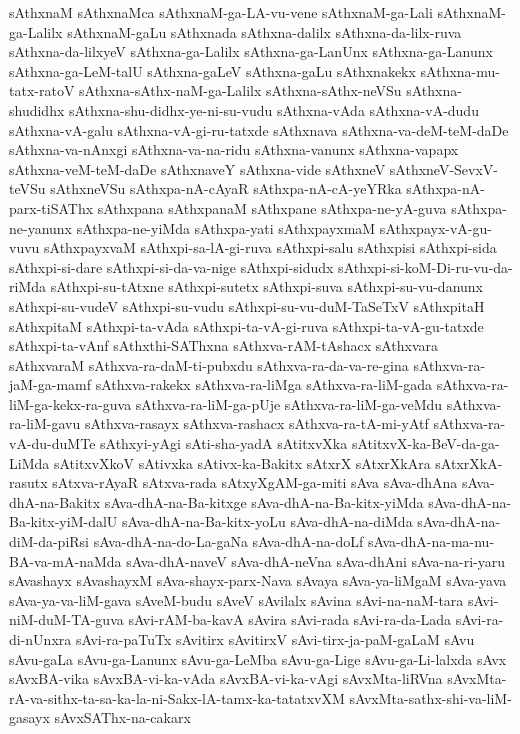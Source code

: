 {sAthxnaM
sAthxnaMca
sAthxnaM-ga-LA-vu-vene
sAthxnaM-ga-Lali
sAthxnaM-ga-Lalilx
sAthxnaM-gaLu
sAthxnada
sAthxna-dalilx
sAthxna-da-lilx-ruva
sAthxna-da-lilxyeV
sAthxna-ga-Lalilx
sAthxna-ga-LanUnx
sAthxna-ga-Lanunx
sAthxna-ga-LeM-talU
sAthxna-gaLeV
sAthxna-gaLu
sAthxnakekx
sAthxna-mu-tatx-ratoV
sAthxna-sAthx-naM-ga-Lalilx
sAthxna-sAthx-neVSu
sAthxna-shudidhx
sAthxna-shu-didhx-ye-ni-su-vudu
sAthxna-vAda
sAthxna-vA-dudu
sAthxna-vA-galu
sAthxna-vA-gi-ru-tatxde
sAthxnava
sAthxna-va-deM-teM-daDe
sAthxna-va-nAnxgi
sAthxna-va-na-ridu
sAthxna-vanunx
sAthxna-vapapx
sAthxna-veM-teM-daDe
sAthxnaveY
sAthxna-vide
sAthxneV
sAthxneV-SevxV-teVSu
sAthxneVSu
sAthxpa-nA-cAyaR
sAthxpa-nA-cA-yeYRka
sAthxpa-nA-parx-tiSAThx
sAthxpana
sAthxpanaM
sAthxpane
sAthxpa-ne-yA-guva
sAthxpa-ne-yanunx
sAthxpa-ne-yiMda
sAthxpa-yati
sAthxpayxmaM
sAthxpayx-vA-gu-vuvu
sAthxpayxvaM
sAthxpi-sa-lA-gi-ruva
sAthxpi-salu
sAthxpisi
sAthxpi-sida
sAthxpi-si-dare
sAthxpi-si-da-va-nige
sAthxpi-sidudx
sAthxpi-si-koM-Di-ru-vu-da-riMda
sAthxpi-su-tAtxne
sAthxpi-sutetx
sAthxpi-suva
sAthxpi-su-vu-danunx
sAthxpi-su-vudeV
sAthxpi-su-vudu
sAthxpi-su-vu-duM-TaSeTxV
sAthxpitaH
sAthxpitaM
sAthxpi-ta-vAda
sAthxpi-ta-vA-gi-ruva
sAthxpi-ta-vA-gu-tatxde
sAthxpi-ta-vAnf
sAthxthi-SAThxna
sAthxva-rAM-tAshacx
sAthxvara
sAthxvaraM
sAthxva-ra-daM-ti-pubxdu
sAthxva-ra-da-va-re-gina
sAthxva-ra-jaM-ga-mamf
sAthxva-rakekx
sAthxva-ra-liMga
sAthxva-ra-liM-gada
sAthxva-ra-liM-ga-kekx-ra-guva
sAthxva-ra-liM-ga-pUje
sAthxva-ra-liM-ga-veMdu
sAthxva-ra-liM-gavu
sAthxva-rasayx
sAthxva-rashacx
sAthxva-ra-tA-mi-yAtf
sAthxva-ra-vA-du-duMTe
sAthxyi-yAgi
sAti-sha-yadA
sAtitxvXka
sAtitxvX-ka-BeV-da-ga-LiMda
sAtitxvXkoV
sAtivxka
sAtivx-ka-Bakitx
sAtxrX
sAtxrXkAra
sAtxrXkA-rasutx
sAtxva-rAyaR
sAtxva-rada
sAtxyXgAM-ga-miti
sAva
sAva-dhAna
sAva-dhA-na-Bakitx
sAva-dhA-na-Ba-kitxge
sAva-dhA-na-Ba-kitx-yiMda
sAva-dhA-na-Ba-kitx-yiM-dalU
sAva-dhA-na-Ba-kitx-yoLu
sAva-dhA-na-diMda
sAva-dhA-na-diM-da-piRsi
sAva-dhA-na-do-La-gaNa
sAva-dhA-na-doLf
sAva-dhA-na-ma-nu-BA-va-mA-naMda
sAva-dhA-naveV
sAva-dhA-neVna
sAva-dhAni
sAva-na-ri-yaru
sAvashayx
sAvashayxM
sAva-shayx-parx-Nava
sAvaya
sAva-ya-liMgaM
sAva-yava
sAva-ya-va-liM-gava
sAveM-budu
sAveV
sAvilalx
sAvina
sAvi-na-naM-tara
sAvi-niM-duM-TA-guva
sAvi-rAM-ba-kavA
sAvira
sAvi-rada
sAvi-ra-da-Lada
sAvi-ra-di-nUnxra
sAvi-ra-paTuTx
sAvitirx
sAvitirxV
sAvi-tirx-ja-paM-gaLaM
sAvu
sAvu-gaLa
sAvu-ga-Lanunx
sAvu-ga-LeMba
sAvu-ga-Lige
sAvu-ga-Li-lalxda
sAvx
sAvxBA-vika
sAvxBA-vi-ka-vAda
sAvxBA-vi-ka-vAgi
sAvxMta-liRVna
sAvxMta-rA-va-sithx-ta-sa-ka-la-ni-Sakx-lA-tamx-ka-tatatxvXM
sAvxMta-sathx-shi-va-liM-gasayx
sAvxSAThx-na-cakarx
}
